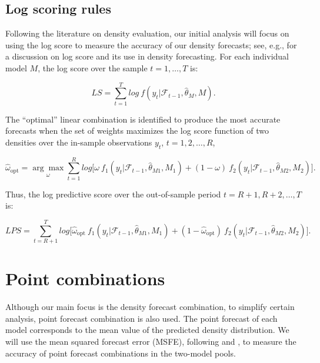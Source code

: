 \documentclass{monashthesis}
\begin{document}
\hypertarget{log-scoring-rules}{%
\subsection{Log scoring rules}\label{log-scoring-rules}}

Following the literature on density evaluation, our initial analysis will focus on using the log score to measure the accuracy of our density forecasts; see, e.g., \textcite{GA11} for a discussion on log score and its use in density forecasting. For each individual model \(M\), the log score over the sample \(t = 1, \dots, T\) is:

\begin{equation}
\label{eqn:LS1}
LS = \sum^T_{t=1} log \ f(y_t| \mathcal{F}_{t-1}, \hat\theta_M, M).
\end{equation}

The ``optimal'' linear combination is identified to produce the most accurate forecasts when the set of weights maximizes the log score function of two densities over the in-sample observations \(y_t\), \(t = 1, 2, \dots, R\),

\begin{equation}
\label{eqn:LS2}
\hat{\omega}_{\text{opt}} = \underset{\omega}{\arg\max} \sum^R_{t=1} log \Big[ \omega \ f_1(y_t| \mathcal{F}_{t-1}, \hat\theta_{M1}, M_1) + (1-\omega) \ f_2(y_t| \mathcal{F}_{t-1}, \hat\theta_{M2}, M_2)\Big].
\end{equation}

Thus, the log predictive score over the out-of-sample period \(t = R+1, R+2, \dots, T\) is:

\begin{equation}
\label{eqn:LS3}
LPS = \sum^T_{t = R+1} log \Big[ \hat{\omega}_{\text{opt}} \ f_1(y_t| \mathcal{F}_{t-1}, \hat\theta_{M1}, M_1) + (1- \hat{\omega}_{\text{opt}}) \ f_2(y_t| \mathcal{F}_{t-1}, \hat\theta_{M2}, M_2)\Big].
\end{equation}

\hypertarget{point-combinations}{%
\section{Point combinations}\label{point-combinations}}

Although our main focus is the density forecast combination, to simplify certain analysis, point forecast combination is also used. The point forecast of each model corresponds to the mean value of the predicted density distribution. We will use the mean squared forecast error (MSFE), following \textcite{BG69} and \textcite{SW09}, to measure the accuracy of point forecast combinations in the two-model pools.
\end{document}
